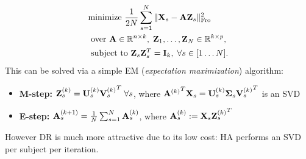 \begin{eqnarray}
  \begin{split}
    &\text{minimize }\frac{1}{2N}\sum_{s=1}^N\|\mathbf{X}_s - \mathbf{A}\mathbf{Z}_s\|^2_{\text{Fro}}\\
    &\text{ over }
  \mathbf{A} \in \mathbb R^{n \times k},\;\mathbf{Z}_1,\ldots,\mathbf{Z}_N \in \mathbb R^{k \times p},
  \\
  &\text{ subject to }\mathbf{Z}_s\mathbf{Z}_s^T = \mathbf{I}_k,\; \forall s \in [1\ldots N].
  \end{split}
\end{eqnarray}
This can be solved via a simple EM (\textit{expectation maximization}) algorithm:

\begin{itemize}
\item \textbf{M-step:} $\mathbf{Z}_s^{(k)} = \mathbf{U}_s^{(k)}{\mathbf{V}_s^{(k)}}^T\; \forall s$, where ${\mathbf{A}^{(k)}}^T\mathbf{X}_s = \mathbf{U}_s^{(k)}\boldsymbol{\Sigma}_s{\mathbf{V}_s^{(k)}}^T$ is an SVD
\item \textbf{E-step:} $\mathbf{A}_s^{(k+1)} = \frac{1}{N}\sum_{s=1}^N\mathbf{A}_s^{(k)}$, where $\mathbf{A}_s^{(k)} := \mathbf{X}_s{{}\mathbf{Z}_s^{(k)}}^T$
\end{itemize}

However DR is much more attractive due to its low cost: HA performs an SVD per subject per iteration.

